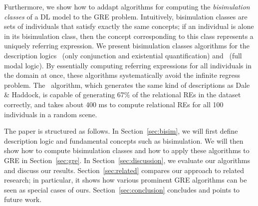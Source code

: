 Furthermore, we show how to addapt algorithms for computing the
\emph{bisimulation classes} of a DL model to the GRE problem.  Intuitively,
bisimulation classes are sets of individuals that satisfy exactly the
same concepts; if an individual is alone in its bisimulation class,
then the concept corresponding to this class represents a uniquely
referring expression.  We present bisimulation classes algorithms for
the description logics \el\ (only conjunction and existential
quantification) and \alc\ (full modal logic).  By essentially
computing referring expressions for all individuals in the domain at
once, these algorithms systematically avoid the infinite regress
problem.  The \el\ algorithm, which generates the same kind of
descriptions as Dale \& Haddock, is capable of generating 67\% of the
relational REs in the
 dataset correctly,
and takes about 400 ms to compute relational REs for all 100
individuals in a random scene.

The paper is structured as follows.  In Section~\ref{sec:bisim}, we
will first define description logic and fundamental concepts such as
bisimulation.  We will then show how to compute bisimulation classes
 and how to apply these algorithms to GRE in Section~\ref{sec:gre}.  In
Section~\ref{sec:discussion}, we evaluate our algorithms and discuss
our results.  Section~\ref{sec:related} compares our approach to
related research; in particular, it shows how various prominent GRE
algorithms can be seen as special cases of ours.
Section~\ref{sec:conclusion} concludes and points to future work.






